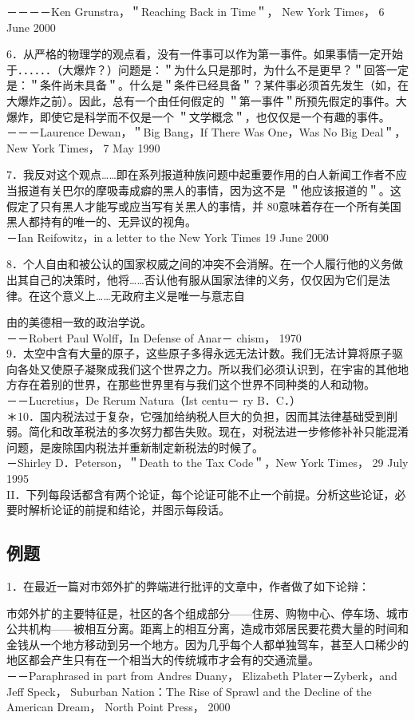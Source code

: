 －－－－Ken Grunstra，＂Reaching Back in Time＂， New York Times， 6 June 2000

6．从严格的物理学的观点看，没有一件事可以作为第一事件。如果事情一定开始于．．．．．．（大爆炸？）问题是：＂为什么只是那时，为什么不是更早？＂回答一定是：＂条件尚未具备＂。什么是＂条件已经具备＂？某件事必须首先发生（如，在大爆炸之前）。因此，总有一个由任何假定的 ＂第一事件＂所预先假定的事件。大爆炸，即使它是科学而不仅是一个 ＂文学概念＂，也仅仅是一个有趣的事件。\\
－－－Laurence Dewan，＂Big Bang，If There Was One，Was No Big Deal＂，New York Times， 7 May 1990

7．我反对这个观点……即在系列报道种族问题中起重要作用的白人新闻工作者不应当报道有关巴尔的摩吸毒成癖的黑人的事情，因为这不是 ＂他应该报道的＂。这假定了只有黑人才能写或应当写有关黑人的事情，并 80意味着存在一个所有美国黑人都持有的唯一的、无异议的视角。\\
－Ian Reifowitz，in a letter to the New York Times 19 June 2000

8．个人自由和被公认的国家权威之间的冲突不会消解。在一个人履行他的义务做出其自己的决策时，他将……否认他有服从国家法律的义务，仅仅因为它们是法律。在这个意义上……无政府主义是唯一与意志自

由的美德相一致的政治学说。\\
－－Robert Paul Wolff，In Defense of Anar－ chism， 1970\\
9．太空中含有大量的原子，这些原子多得永远无法计数。我们无法计算将原子驱向各处又使原子凝聚成我们这个世界之力。所以我们必须认识到，在宇宙的其他地方存在着别的世界，在那些世界里有与我们这个世界不同种类的人和动物。\\
－－Lucretius，De Rerum Natura（Ist centu－ ry B．C．）\\
＊10．国内税法过于复杂，它强加给纳税人巨大的负担，因而其法律基础受到削弱。简化和改革税法的多次努力都告失败。现在，对税法进一步修修补补只能混淆问题，是废除国内税法并重新制定新税法的时候了。\\
－Shirley D．Peterson，＂Death to the Tax Code＂，New York Times， 29 July 1995\\
II．下列每段话都含有两个论证，每个论证可能不止一个前提。分析这些论证，必要时解析论证的前提和结论，并图示每段话。

\subsection{例题}
1．在最近一篇对市郊外扩的弊端进行批评的文章中，作者做了如下论辩：

市郊外扩的主要特征是，社区的各个组成部分——住房、购物中心、停车场、城市公共机构——被相互分离。距离上的相互分离，造成市郊居民要花费大量的时间和金钱从一个地方移动到另一个地方。因为几乎每个人都单独驾车，甚至人口稀少的地区都会产生只有在一个相当大的传统城市才会有的交通流量。\\
－－Paraphrased in part from Andres Duany， Elizabeth Plater－Zyberk，and Jeff Speck， Suburban Nation：The Rise of Sprawl and the Decline of the American Dream， North Point Press， 2000

